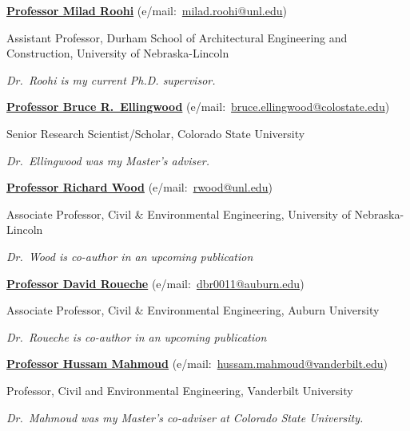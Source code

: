 \documentclass[10pt]{article}
\begin{document}
\href{https://engineering.unl.edu/durhamschool/person/milad-roohi/}{\textbf{Professor Milad Roohi}}
(e\-/mail:~\href{mailto:milad.roohi@unl.edu}{milad.roohi@unl.edu})
\begin{innerlist}
    \item Assistant Professor, Durham School of Architectural Engineering and Construction, University of Nebraska-Lincoln
    \item[$\star$] \emph{Dr.~Roohi is my current Ph.D. supervisor.}
\end{innerlist}
\vspace{0.1in}

\href{https://www.engr.colostate.edu/ce/people/bruce-ellingwood/}{\textbf{Professor Bruce R.~Ellingwood}}
(e\-/mail:~\href{mailto:bruce.ellingwood@colostate.edu}{bruce.ellingwood@colostate.edu})
\begin{innerlist}
    \item Senior Research Scientist/Scholar, Colorado State University
    \item[$\star$] \emph{Dr.~Ellingwood was my Master's adviser.}
\end{innerlist}
\vspace{0.1in}

\href{https://engineering.unl.edu/civil/person/richard-wood/}{\textbf{Professor Richard Wood}}
(e\-/mail:~\href{mailto:rwood@unl.edu}{rwood@unl.edu})
\begin{innerlist}
	\item Associate Professor, Civil \& Environmental Engineering, University of Nebraska-Lincoln
	\item[$\star$] \emph{Dr.~Wood is co-author in an upcoming publication}
\end{innerlist}
\vspace{0.1in}

\href{https://eng.auburn.edu/directory/dbr0011}{\textbf{Professor David Roueche}}
(e\-/mail:~\href{mailto:dbr0011@auburn.edu}{dbr0011@auburn.edu})
\begin{innerlist}
	\item Associate Professor, Civil \& Environmental Engineering, Auburn University
	\item[$\star$] \emph{Dr.~Roueche is co-author in an upcoming publication}
\end{innerlist}
\vspace{0.1in}

\href{https://engineering.vanderbilt.edu/bio/?pid=hussam-mahmoud}{\textbf{Professor Hussam Mahmoud}}
(e\-/mail:~\href{mailto:hussam.mahmoud@vanderbilt.edu}{hussam.mahmoud@vanderbilt.edu})
\begin{innerlist}
    \item Professor, Civil and Environmental Engineering, Vanderbilt University
    \item[$\star$] \emph{Dr.~Mahmoud was my Master's co-adviser at Colorado State University.}
\end{innerlist}
\vspace{0.1in}
\end{document}
